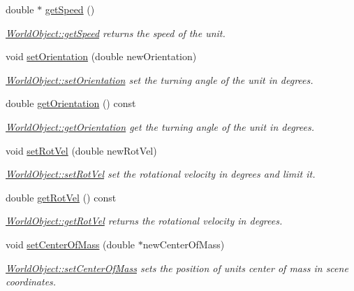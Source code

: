 \begin{DoxyCompactItemize}
\item 
double $\ast$ \hyperlink{class_world_object_a4a9c0e80e36b49cd7d4f574ca6351249}{get\+Speed} ()
\begin{DoxyCompactList}\small\item\em \hyperlink{class_world_object_a4a9c0e80e36b49cd7d4f574ca6351249}{World\+Object\+::get\+Speed} returns the speed of the unit. \end{DoxyCompactList}\item 
void \hyperlink{class_world_object_a0dbc4225453661d4578c7fd9eb00ab73}{set\+Orientation} (double new\+Orientation)
\begin{DoxyCompactList}\small\item\em \hyperlink{class_world_object_a0dbc4225453661d4578c7fd9eb00ab73}{World\+Object\+::set\+Orientation} set the turning angle of the unit in degrees. \end{DoxyCompactList}\item 
double \hyperlink{class_world_object_a19516f1bc3450350c42cfe467dabf4f8}{get\+Orientation} () const 
\begin{DoxyCompactList}\small\item\em \hyperlink{class_world_object_a19516f1bc3450350c42cfe467dabf4f8}{World\+Object\+::get\+Orientation} get the turning angle of the unit in degrees. \end{DoxyCompactList}\item 
void \hyperlink{class_world_object_a4fc971089870ff9db55c767694056f2f}{set\+Rot\+Vel} (double new\+Rot\+Vel)
\begin{DoxyCompactList}\small\item\em \hyperlink{class_world_object_a4fc971089870ff9db55c767694056f2f}{World\+Object\+::set\+Rot\+Vel} set the rotational velocity in degrees and limit it. \end{DoxyCompactList}\item 
double \hyperlink{class_world_object_a92c64315b40802ee97bf3cd5f16a3538}{get\+Rot\+Vel} () const 
\begin{DoxyCompactList}\small\item\em \hyperlink{class_world_object_a92c64315b40802ee97bf3cd5f16a3538}{World\+Object\+::get\+Rot\+Vel} returns the rotational velocity in degrees. \end{DoxyCompactList}\item 
void \hyperlink{class_world_object_a14befa1bd922a8c9f7134352103de942}{set\+Center\+Of\+Mass} (double $\ast$new\+Center\+Of\+Mass)
\begin{DoxyCompactList}\small\item\em \hyperlink{class_world_object_a14befa1bd922a8c9f7134352103de942}{World\+Object\+::set\+Center\+Of\+Mass} sets the position of units center of mass in scene coordinates. \end{DoxyCompactList}\item 

\end{DoxyCompactItemize}
